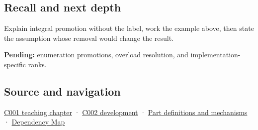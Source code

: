 \subsection{Recall and next depth}\label{appendix-45303d03796a-recall-and-next-depth}

Explain integral promotion without the label, work the example above, then state the assumption whose removal would change the result.

\textbf{Pending:} enumeration promotions, overload resolution, and implementation-specific ranks.

\subsection{Source and navigation}\label{appendix-45303d03796a-source-and-navigation}

\hyperref[01-foundations-i-ch001-from-a-signal-to-an-interpretation]{C001 teaching chapter} · \hyperref[01-foundations-i-ch001-arithmetic-becomes-a-policy]{C002 development} · \hyperref[appendix-fd090d982a15]{Part definitions and mechanisms} · \hyperref[appendix-4ad47bdd269a]{Dependency Map}
